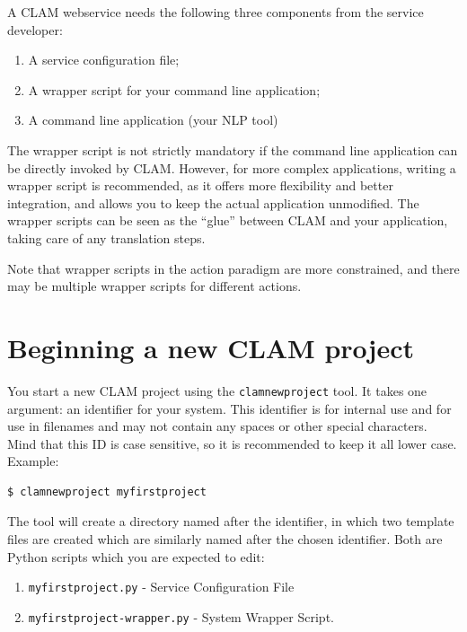 \documentclass[a4paper,12pt,twoside,openright]{report}
\begin{document}
A CLAM webservice needs the following three components from the service developer:

\begin{enumerate}
\item A service configuration file;
\item A wrapper script for your command line application;
\item A command line application (your NLP tool)
\end{enumerate}

The wrapper script is not strictly mandatory if the command line application can be
directly invoked by CLAM. However, for more complex applications, writing a
wrapper script is recommended, as it offers more flexibility and
better integration, and allows you to keep the actual application
unmodified. The wrapper scripts can be seen as the ``glue'' between CLAM and
your application, taking care of any translation steps.

Note that wrapper scripts in the action paradigm are more constrained,  and
there may be multiple wrapper scripts for different actions.

\section{Beginning a new CLAM project}

You start a new CLAM project using the \texttt{clamnewproject} tool. It takes
one argument: an identifier for your system. This identifier is for internal
use and for use in filenames and may not contain any spaces or other special
characters. Mind that this ID is case sensitive, so it is recommended to keep
it all lower case. Example:

{ \small
\begin{verbatim}
$ clamnewproject myfirstproject 
\end{verbatim}
}

The tool will create a directory named after the identifier, in which two
template files are created which are similarly named after the chosen
identifier. Both are Python scripts which you are expected to edit:

\begin{enumerate}
\item \texttt{myfirstproject.py} - Service Configuration File
\item \texttt{myfirstproject-wrapper.py} - System Wrapper Script.
\end{enumerate}
\end{document}
